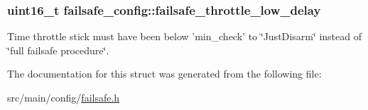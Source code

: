 \hypertarget{structfailsafe__config_ad263d0e9fa56496bba2520c677e39949}{
\subsubsection[{failsafe\+\_\+throttle\+\_\+low\+\_\+delay}]{\setlength{\rightskip}{0pt plus 5cm}uint16\+\_\+t failsafe\+\_\+config\+::failsafe\+\_\+throttle\+\_\+low\+\_\+delay}}\label{structfailsafe__config_ad263d0e9fa56496bba2520c677e39949}


Time throttle stick must have been below 'min\+\_\+check' to \char`\"{}\+Just\+Disarm\char`\"{} instead of \char`\"{}full failsafe procedure\char`\"{}. 



The documentation for this struct was generated from the following file\+:\begin{DoxyCompactItemize}
\item 
src/main/config/\hyperlink{config_2failsafe_8h}{failsafe.\+h}\end{DoxyCompactItemize}
